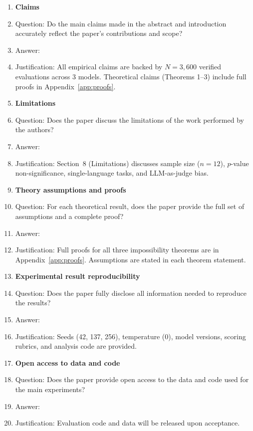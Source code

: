 \documentclass{article}
\begin{document}
\begin{enumerate}
\item {\bf Claims}
    \item[] Question: Do the main claims made in the abstract and introduction accurately reflect the paper's contributions and scope?
    \item[] Answer: \answerYes{}
    \item[] Justification: All empirical claims are backed by $N{=}3{,}600$ verified evaluations across 3 models. Theoretical claims (Theorems 1--3) include full proofs in Appendix~\ref{app:proofs}.

\item {\bf Limitations}
    \item[] Question: Does the paper discuss the limitations of the work performed by the authors?
    \item[] Answer: \answerYes{}
    \item[] Justification: Section~8 (Limitations) discusses sample size ($n{=}12$), $p$-value non-significance, single-language tasks, and LLM-as-judge bias.

\item {\bf Theory assumptions and proofs}
    \item[] Question: For each theoretical result, does the paper provide the full set of assumptions and a complete proof?
    \item[] Answer: \answerYes{}
    \item[] Justification: Full proofs for all three impossibility theorems are in Appendix~\ref{app:proofs}. Assumptions are stated in each theorem statement.

\item {\bf Experimental result reproducibility}
    \item[] Question: Does the paper fully disclose all information needed to reproduce the results?
    \item[] Answer: \answerYes{}
    \item[] Justification: Seeds (42, 137, 256), temperature (0), model versions, scoring rubrics, and analysis code are provided.

\item {\bf Open access to data and code}
    \item[] Question: Does the paper provide open access to the data and code used for the main experiments?
    \item[] Answer: \answerYes{}
    \item[] Justification: Evaluation code and data will be released upon acceptance.


\end{enumerate}
\end{document}
